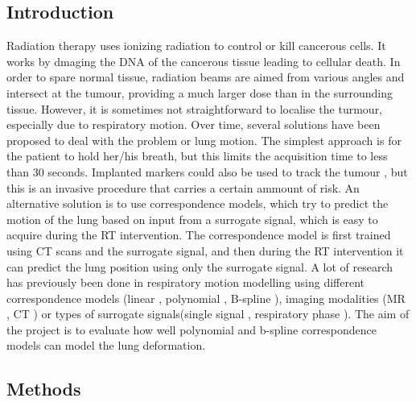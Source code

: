 \documentclass[11pt,a4paper,oneside]{report}
\begin{document}

\subsection*{Introduction}
Radiation therapy uses ionizing radiation to control or kill cancerous cells. It works by dmaging the DNA of the cancerous tissue leading to cellular death. In order to spare normal tissue, radiation beams are aimed from various angles and intersect at the tumour, providing a much larger dose than in the surrounding tissue. However, it is sometimes not straightforward to localise the turmour, especially due to respiratory motion. Over time, several solutions have been proposed to deal with the problem or lung motion. The simplest approach is for the patient to hold her/his breath, but this limits the acquisition time to less than 30 seconds. Implanted markers could also be used to track the tumour \cite{shirato2000physical}, but this is an invasive procedure that carries a certain ammount of risk. 
An alternative solution is to use correspondence models, which try to predict the motion of the lung based on input from a surrogate signal, which is easy to acquire during the RT intervention. The correspondence model is first trained using CT scans and the surrogate signal, and then during the RT intervention it can predict the lung position using only the surrogate signal. A lot of research has previously been done in respiratory motion modelling using different correspondence models (linear \cite{schweikard2000robotic}, polynomial \cite{mcclelland20054d}, B-spline \cite{buerger2012nonrigid}), imaging modalities (MR \cite{manke2003novel}, CT \cite{mcclelland20054d}) or types of surrogate signals(single signal \cite{schweikard2000robotic}, respiratory phase \cite{shechter2004respiratory}). The aim of the project is to evaluate how well polynomial and b-spline correspondence models can model the lung deformation. 

\subsection*{Methods}
\end{document}
